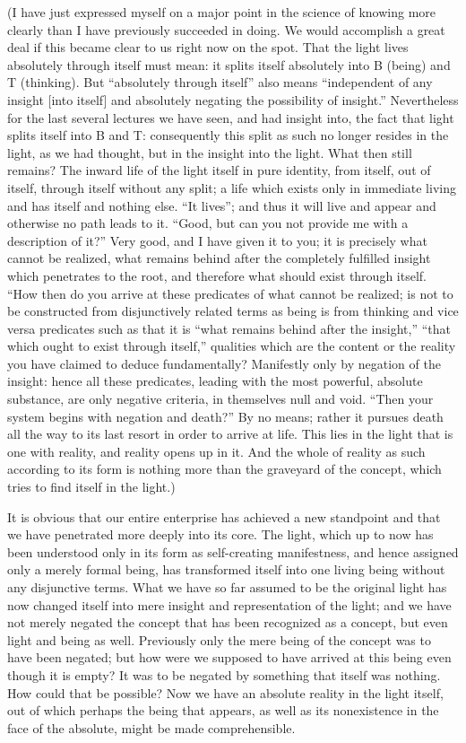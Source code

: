 (I have just expressed myself on a major point
in the science of knowing more clearly than
I have previously succeeded in doing.
We would accomplish a great deal if this
became clear to us right now on the spot.
That the light lives absolutely through itself must mean:
it splits itself absolutely into B (being) and T (thinking).
But “absolutely through itself” also means
“independent of any insight [into itself]
and absolutely negating the possibility of insight.”
Nevertheless for the last several lectures
we have seen, and had insight into,
the fact that light splits itself into B and T:
consequently this split as such
no longer resides in the light, as we had thought,
but in the insight into the light.
What then still remains?
The inward life of the light itself in pure identity,
from itself, out of itself, through itself
without any split;
a life which exists only in immediate living
and has itself and nothing else.
“It lives”;
and thus it will live and appear
and otherwise no path leads to it.
“Good, but can you not provide me
with a description of it?”
Very good, and I have given it to you;
it is precisely what cannot be realized,
what remains behind after
the completely fulfilled insight
which penetrates to the root,
and therefore what should exist through itself.
“How then do you arrive at these predicates
of what cannot be realized;
is not to be constructed from disjunctively related terms
as being is from thinking and vice versa
predicates such as that it is
“what remains behind after the insight,”
“that which ought to exist through itself,”
qualities which are the content or the reality
you have claimed to deduce fundamentally?
Manifestly only by negation of the insight:
hence all these predicates,
leading with the most powerful, absolute substance,
are only negative criteria, in themselves null and void.
“Then your system begins with negation and death?”
By no means;
rather it pursues death
all the way to its last resort
in order to arrive at life.
This lies in the light
that is one with reality,
and reality opens up in it.
And the whole of reality as such
according to its form is
nothing more than the graveyard of the concept,
which tries to find itself in the light.)

It is obvious that our entire enterprise
has achieved a new standpoint
and that we have penetrated more deeply into its core.
The light, which up to now has been understood only
in its form as self-creating manifestness,
and hence assigned only a merely formal being,
has transformed itself into one living being
without any disjunctive terms.
What we have so far assumed to be
the original light has now changed itself
into mere insight and representation of the light;
and we have not merely negated the concept
that has been recognized as a concept,
but even light and being as well.
Previously only the mere being
of the concept was to have been negated;
but how were we supposed to have arrived
at this being even though it is empty?
It was to be negated by something
that itself was nothing.
How could that be possible?
Now we have an absolute reality
in the light itself,
out of which perhaps the being that appears,
as well as its nonexistence in the face of the absolute,
might be made comprehensible.

